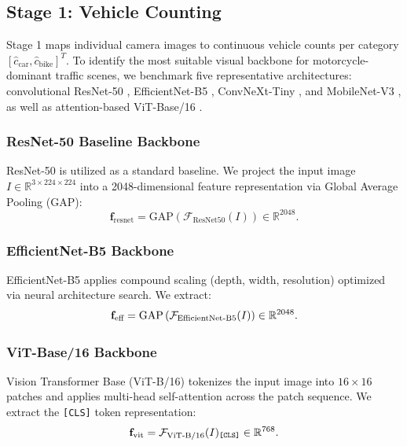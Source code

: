\documentclass[journal,twocolumn]{IEEEtran}
\begin{document}
\subsection{Stage 1: Vehicle Counting}
\label{sec:subproblem1}

Stage 1 maps individual camera images to continuous vehicle counts per category $[\hat{c}_{\text{car}}, \hat{c}_{\text{bike}}]^T$. To identify the most suitable visual backbone for motorcycle-dominant traffic scenes, we benchmark five representative architectures: convolutional ResNet-50 \cite{resnet}, EfficientNet-B5 \cite{efficientnet}, ConvNeXt-Tiny \cite{convnext}, and MobileNet-V3 \cite{mobilenet}, as well as attention-based ViT-Base/16 \cite{vit}.

\subsubsection{ResNet-50 Baseline Backbone}
ResNet-50 \cite{resnet} is utilized as a standard baseline. We project the input image $I \in \mathbb{R}^{3 \times 224 \times 224}$ into a 2048-dimensional feature representation via Global Average Pooling (GAP):
\begin{equation}
\mathbf{f}_{\text{resnet}} = \text{GAP}\left(\mathcal{F}_{\text{ResNet50}}(I)\right) \in \mathbb{R}^{2048}.
\end{equation}

\subsubsection{EfficientNet-B5 Backbone}
EfficientNet-B5 \cite{efficientnet} applies compound scaling (depth, width, resolution) optimized via neural architecture search. We extract:
\begin{equation}
\mathbf{f}_{\text{eff}} = \text{GAP}\left(\mathcal{F}_{\text{EfficientNet\text{-}B5}}(I)\right) \in \mathbb{R}^{2048}.
\end{equation}

\subsubsection{ViT-Base/16 Backbone}
Vision Transformer Base (ViT-B/16) \cite{vit} tokenizes the input image into $16 \times 16$ patches and applies multi-head self-attention across the patch sequence. We extract the \texttt{[CLS]} token representation:
\begin{equation}
\mathbf{f}_{\text{vit}} = \mathcal{F}_{\text{ViT\text{-}B/16}}(I)_{\texttt{[CLS]}} \in \mathbb{R}^{768}.
\end{equation}
\end{document}
